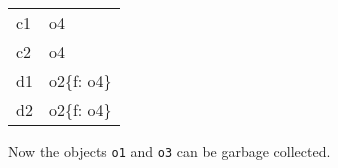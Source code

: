 \documentclass[11pt]{exam}
\begin{document}
\begin{questions}
\begin{framed}
{\begin{enumerate}
                    \begin{tabular}{|l|l|}
                        \hline
                        c1 & o4 \\
                        c2 & o4 \\
                        d1 & o2\{f: o4\} \\
                        d2 & o2\{f: o4\} \\
                        \hline
                    \end{tabular}
            \end{enumerate}
            }
            Now the objects {\tt o1} and {\tt o3} can be garbage collected.
	\end{framed}

\end{questions}
\end{document}
